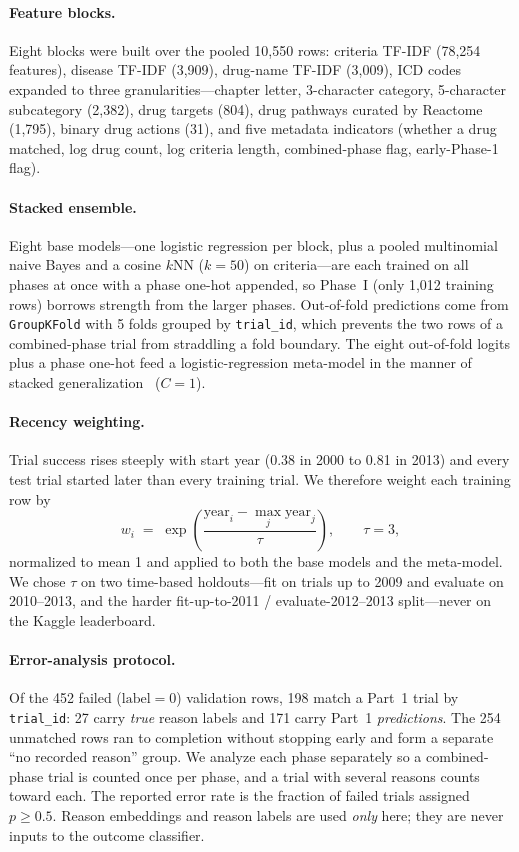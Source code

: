 \paragraph{Feature blocks.}
Eight blocks were built over the pooled 10,550 rows: criteria TF-IDF (78,254
features), disease TF-IDF (3,909), drug-name TF-IDF (3,009), ICD codes expanded to
three granularities---chapter letter, 3-character category, 5-character
subcategory (2,382), drug targets (804), drug pathways curated by Reactome~\cite{milacic2024reactome} (1,795), binary drug
actions (31), and five metadata indicators (whether a drug matched, log drug
count, log criteria length, combined-phase flag, early-Phase-1 flag).

\paragraph{Stacked ensemble.}
Eight base models---one logistic regression per block, plus a pooled multinomial
naive Bayes and a cosine $k$NN ($k = 50$) on criteria---are each trained on all
phases at once with a phase one-hot appended, so Phase~I (only 1,012 training
rows) borrows strength from the larger phases. Out-of-fold predictions come from
\texttt{GroupKFold} with 5 folds grouped by \texttt{trial\_id}, which prevents the
two rows of a combined-phase trial from straddling a fold boundary. The eight
out-of-fold logits plus a phase one-hot feed a logistic-regression meta-model in
the manner of stacked generalization~\cite{wolpert1992stacked}
($C = 1$).

\paragraph{Recency weighting.}
Trial success rises steeply with start year (0.38 in 2000 to 0.81 in 2013) and
every test trial started later than every training trial. We therefore weight each
training row by
\begin{equation}
w_i \;=\; \exp\!\left(\frac{\text{year}_i - \max_j \text{year}_j}{\tau}\right),
\qquad \tau = 3,
\end{equation}
normalized to mean 1 and applied to both the base models and the meta-model. We
chose $\tau$ on two time-based holdouts---fit on trials up to 2009 and evaluate on
2010--2013, and the harder fit-up-to-2011 / evaluate-2012--2013 split---never on
the Kaggle leaderboard.

\paragraph{Error-analysis protocol.}
Of the 452 failed ($\text{label}=0$) validation rows, 198 match a Part~1 trial by
\texttt{trial\_id}: 27 carry \emph{true} reason labels and 171 carry Part~1
\emph{predictions}. The 254 unmatched rows ran to completion without stopping
early and form a separate ``no recorded reason'' group. We analyze each phase
separately so a combined-phase trial is counted once per phase, and a trial with
several reasons counts toward each. The reported error rate is the fraction of
failed trials assigned $p \geq 0.5$. Reason embeddings and reason labels are used
\emph{only} here; they are never inputs to the outcome classifier.
